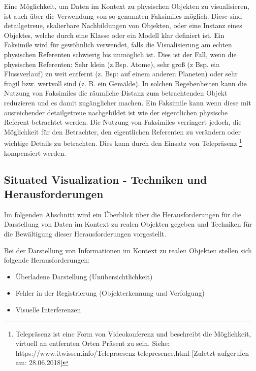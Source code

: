 \cite{Willett2017}Eine Möglichkeit, um Daten im Kontext zu physischen Objekten zu visualisieren, ist auch über die Verwendung von so genannten Faksimiles möglich. Diese sind detailgetreue, skalierbare Nachbildungen von Objekten, oder eine Instanz eines Objektes, welche durch eine Klasse oder ein Modell klar definiert ist. Ein Faksimile wird für gewöhnlich verwendet, falls die Visualisierung am echten physischen Referenten schwierig bis unmöglich ist. Dies ist der Fall, wenn die physischen Referenten: Sehr klein (z.Bsp. Atome), sehr groß (z Bsp. ein Flussverlauf) zu weit entfernt (z. Bsp: auf einem anderen Planeten) oder sehr fragil bzw. wertvoll sind (z. B. ein Gemälde). 
In solchen Begebenheiten kann die Nutzung von Faksimiles die räumliche Distanz zum betrachtenden Objekt reduzieren und es damit zugänglicher machen. Ein Faksimile kann wenn diese mit ausreichender detailgetreue nachgebildet ist wie der eigentlichen physische Referent betrachtet werden. Die Nutzung von Faksimiles verringert jedoch, die Möglichkeit für den Betrachter, den eigentlichen Referenten zu verändern oder wichtige Details zu betrachten. Dies kann durch den Einsatz von Telepräsenz \footnote{Telepräsenz ist eine Form von Videokonferenz und beschreibt die Möglichkeit, virtuell an entfernten Orten Präsent zu sein. Siehe: https://www.itwissen.info/Telepraesenz-telepresence.html [Zuletzt aufgerufen am: 28.06.2018]} kompensiert werden. 


\subsection{Situated Visualization - Techniken und Herausforderungen}

Im folgenden Abschnitt wird ein Überblick über die Herausforderungen für die Darstellung von Daten im Kontext zu realen Objekten 
gegeben und Techniken für die Bewältigung dieser Herausforderungen vorgestellt.

\cite{DieterSchmalstieg2016} Bei der Darstellung von Informationen im Kontext zu realen Objekten stellen sich folgende Herausforderungen:

\begin{itemize}
	\item Überladene Darstellung (Unübersichtlichkeit)
	\item Fehler in der Registrierung (Objekterkennung und Verfolgung)
	\item Visuelle Interferenzen
\end{itemize}

